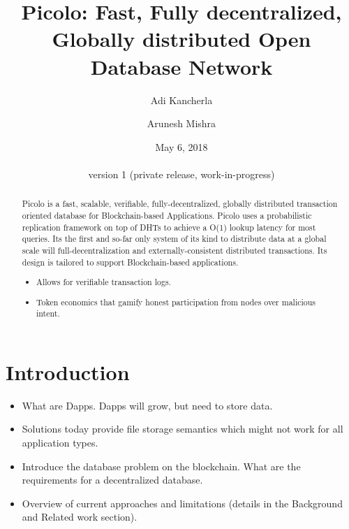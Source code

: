 \documentclass[a4paper]{article}
\begin{document}
\pagecolor{oldlace}

\title{Picolo: Fast, Fully decentralized, Globally distributed Open Database Network}
\author{Adi Kancherla \and Arunesh Mishra}
\date{May 6, 2018 \\\hfill \\version 1 (private release, work-in-progress)}
\maketitle
\begin{abstract}

Picolo is a fast, scalable, verifiable, fully-decentralized, globally distributed transaction oriented database for
Blockchain-based Applications. Picolo uses a probabilistic replication framework on top of DHTs to achieve a O(1)
lookup latency for most queries. Its the first and so-far only system of its kind to distribute data at a global
scale will full-decentralization and externally-consistent distributed transactions. Its design is tailored to
support Blockchain-based applications.

\begin{itemize}
    \item Allows for verifiable transaction logs.
    \item Token economics that gamify honest participation from nodes over malicious intent.
\end{itemize}

\end{abstract}


\section{Introduction}\label{Sect:Introduction}


    \begin{itemize}
        \item What are Dapps. Dapps will grow, but need to store data.
        \item Solutions today provide file storage semantics which might not work for all application types.
        \item Introduce the database problem on the blockchain. What are the requirements for a decentralized database.
        \item Overview of current approaches and limitations (details in the Background and Related work section).
    \end{itemize}
\end{document}
